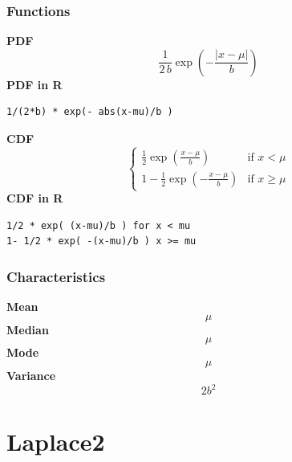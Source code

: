 \subsubsection*{Functions}

\smallskip \noindent \hspace{.2cm} \textbf{PDF} 
\begin{equation*}\frac{1}{2\,b} \exp \left(-\frac{|x-\mu|}b \right)\end{equation*}
\smallskip \noindent \hspace{.2cm} \textbf{PDF in R}  
\begin{verbatim}1/(2*b) * exp(- abs(x-mu)/b )\end{verbatim}
\smallskip \noindent \hspace{.2cm} \textbf{CDF} 
\begin{equation*}\begin{cases}
      \frac12 \exp \left( \frac{x-\mu}{b} \right) & \mbox{if }x < \mu \\
          1-\frac12 \exp \left( -\frac{x-\mu}{b} \right) & \mbox{if }x \geq \mu
       \end{cases}\end{equation*}
\smallskip \noindent \hspace{.2cm} \textbf{CDF in R} 
\begin{verbatim}1/2 * exp( (x-mu)/b ) for x < mu
1- 1/2 * exp( -(x-mu)/b ) x >= mu\end{verbatim}
\smallskip
\subsubsection*{Characteristics}
\smallskip \noindent \hspace{.2cm} \textbf{Mean} 
\begin{equation*}\mu\end{equation*}
\smallskip \noindent \hspace{.2cm} \textbf{Median} 
\begin{equation*}\mu\end{equation*}
\smallskip \noindent \hspace{.2cm} \textbf{Mode} 
\begin{equation*}\mu\end{equation*}
\smallskip \noindent \hspace{.2cm} \textbf{Variance} 
\begin{equation*}2 b^2\end{equation*}
\smallskip
\section*{Laplace2} 

